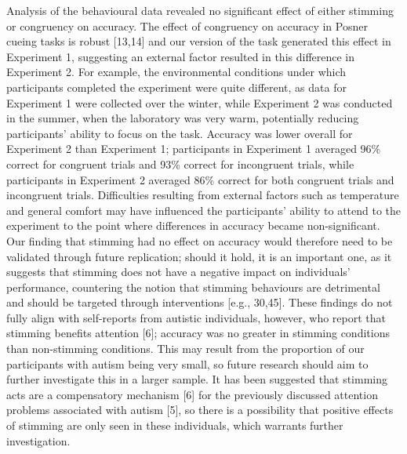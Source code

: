 \documentclass[
  letterpaper,
  DIV=11,
  numbers=noendperiod]{scrartcl}
\begin{document}
Analysis of the behavioural data revealed no significant effect of
either stimming or congruency on accuracy. The effect of congruency on
accuracy in Posner cueing tasks is robust {[}13,14{]} and our version of
the task generated this effect in Experiment 1, suggesting an external
factor resulted in this difference in Experiment 2. For example, the
environmental conditions under which participants completed the
experiment were quite different, as data for Experiment 1 were collected
over the winter, while Experiment 2 was conducted in the summer, when
the laboratory was very warm, potentially reducing participants' ability
to focus on the task. Accuracy was lower overall for Experiment 2 than
Experiment 1; participants in Experiment 1 averaged 96\% correct for
congruent trials and 93\% correct for incongruent trials, while
participants in Experiment 2 averaged 86\% correct for both congruent
trials and incongruent trials. Difficulties resulting from external
factors such as temperature and general comfort may have influenced the
participants' ability to attend to the experiment to the point where
differences in accuracy became non-significant. Our finding that
stimming had no effect on accuracy would therefore need to be validated
through future replication; should it hold, it is an important one, as
it suggests that stimming does not have a negative impact on
individuals' performance, countering the notion that stimming behaviours
are detrimental and should be targeted through interventions {[}e.g.,
30,45{]}. These findings do not fully align with self-reports from
autistic individuals, however, who report that stimming benefits
attention {[}6{]}; accuracy was no greater in stimming conditions than
non-stimming conditions. This may result from the proportion of our
participants with autism being very small, so future research should aim
to further investigate this in a larger sample. It has been suggested
that stimming acts are a compensatory mechanism {[}6{]} for the
previously discussed attention problems associated with autism {[}5{]},
so there is a possibility that positive effects of stimming are only
seen in these individuals, which warrants further investigation.
\end{document}

